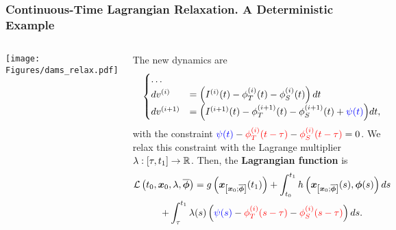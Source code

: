 \begin{frame}
\frametitle{Continuous-Time Lagrangian Relaxation. A Deterministic Example}

\begin{columns}[c] %

\centering
\texttt{[image: Figures/dams\_relax.pdf]}

The new dynamics are
\begin{equation*}
\begin{cases}
\dots\\
dv^{(i)}&=\left(I^{(i)}(t)-\phi_T^{(i)}(t)-\phi_S^{(i)}(t)\right)dt\\
dv^{(i+1)}&=\Big(I^{(i+1)}(t)-\phi_T^{(i+1)}(t)-\phi_S^{(i+1)}(t)+{\color{blue}\psi(t)}\Big)dt,
\end{cases}
\end{equation*}
with the constraint ${\color{blue}\psi(t)}-{\color{red}\phi_T^{(i)}(t-\tau)}-{\color{red}\phi_S^{(i)}(t-\tau)}=0$. We relax this constraint with the Lagrange multiplier $\lambda:[\tau,t_1]\to\mathbb{R}$. Then, the \textbf{Lagrangian function} is
{\small\begin{multline*}
\mathcal{L}\left(t_0,\bm{x}_0,\lambda,\overline{\bm{\phi}}\right)=g\left(\bm{x}_{\left[\bm{x}_0;\overline{\bm{\phi}}\right]}(t_1)\right)+\int_{t_0}^{t_1}h\left(\bm{x}_{\left[\bm{x}_0;\overline{\bm{\phi}}\right]}(s),\bm{\phi}(s)\right)ds\\
+\int_{\tau}^{t_1}\lambda(s)\left({\color{blue}\psi(s)}-{\color{red}\phi_T^{(i)}(s-\tau)}-{\color{red}\phi_S^{(i)}(s-\tau)}\right)ds.
\end{multline*}}
\end{columns}

\end{frame}


